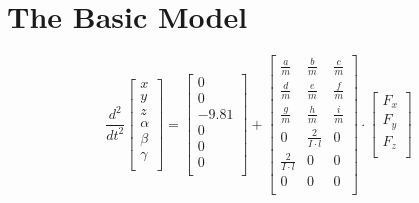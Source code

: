 \section*{The Basic Model}
\begin{equation*}
    \frac{d^{2}}{dt^{2}}
    \begin{bmatrix}
        x\\
        y\\
        z\\
        \alpha\\
        \beta\\
        \gamma\\
    \end{bmatrix}
    =
    \begin{bmatrix}
        0\\
        0\\
        -9.81\\
        0\\
        0\\
        0\\
    \end{bmatrix}
    +
    \begin{bmatrix}
        \frac{a}{m} & \frac{b}{m} & \frac{c}{m}\\
        \frac{d}{m} & \frac{e}{m} & \frac{f}{m}\\
        \frac{g}{m} & \frac{h}{m} & \frac{i}{m}\\
        0 & \frac{2}{I \cdot l} & 0\\
        \frac{2}{I \cdot l} & 0 & 0\\
        0 & 0 & 0\\
    \end{bmatrix}
    \cdot
    \begin{bmatrix}
        F_{x}\\
        F_{y}\\
        F_{z}\\
    \end{bmatrix}
\end{equation*}

